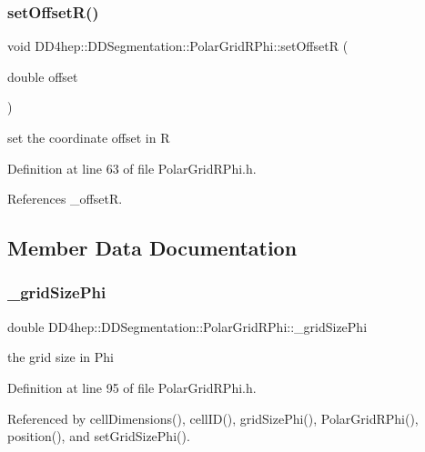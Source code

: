 \subsubsection{\texorpdfstring{set\+Offset\+R()}{setOffsetR()}}
{\footnotesize\ttfamily void D\+D4hep\+::\+D\+D\+Segmentation\+::\+Polar\+Grid\+R\+Phi\+::set\+OffsetR (\begin{DoxyParamCaption}\item[{double}]{offset }\end{DoxyParamCaption})\hspace{0.3cm}{\ttfamily [inline]}}



set the coordinate offset in R 



Definition at line 63 of file Polar\+Grid\+R\+Phi.\+h.



References \+\_\+offsetR.



\subsection{Member Data Documentation}
\hypertarget{class_d_d4hep_1_1_d_d_segmentation_1_1_polar_grid_r_phi_abf48a7497f4d676d89b36371e4cf0af7}{}\label{class_d_d4hep_1_1_d_d_segmentation_1_1_polar_grid_r_phi_abf48a7497f4d676d89b36371e4cf0af7} 
\subsubsection{\texorpdfstring{\+\_\+grid\+Size\+Phi}{\_gridSizePhi}}
{\footnotesize\ttfamily double D\+D4hep\+::\+D\+D\+Segmentation\+::\+Polar\+Grid\+R\+Phi\+::\+\_\+grid\+Size\+Phi\hspace{0.3cm}{\ttfamily [protected]}}



the grid size in Phi 



Definition at line 95 of file Polar\+Grid\+R\+Phi.\+h.



Referenced by cell\+Dimensions(), cell\+I\+D(), grid\+Size\+Phi(), Polar\+Grid\+R\+Phi(), position(), and set\+Grid\+Size\+Phi().

